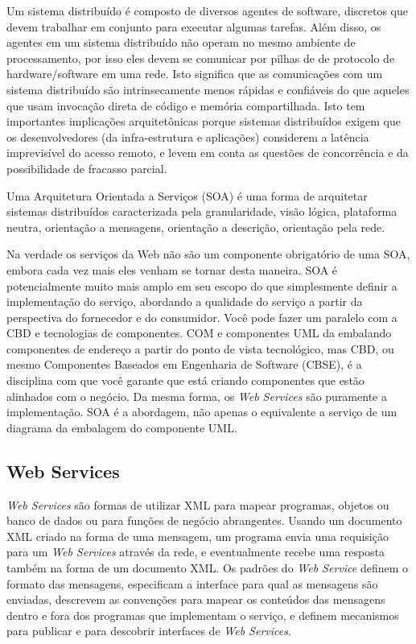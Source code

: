 \documentclass{acm_proc_article-sp}
\begin{document}
		\cite{SOA-Microsoft}
		
		Um sistema distribuído é composto de diversos agentes de software, discretos que devem trabalhar em conjunto para executar algumas tarefas. Além disso, os agentes em um sistema distribuído não operam no mesmo ambiente de processamento, por isso eles devem se comunicar por pilhas de de protocolo de hardware/software em uma rede. Isto significa que as comunicações com um sistema distribuído são intrinsecamente menos rápidas e confiáveis do que aqueles que usam invocação direta de código e memória compartilhada. Isto tem importantes implicações arquitetônicas porque sistemas distribuídos exigem que os desenvolvedores (da infra-estrutura e aplicações) considerem a latência imprevisível do acesso remoto, e levem em conta as questões de concorrência e da possibilidade de fracasso parcial.
		
		Uma Arquitetura Orientada a Serviços (SOA) é uma forma de arquitetar sistemas distribuídos caracterizada pela granularidade, visão lógica, plataforma neutra, orientação a mensagens, orientação a descrição, orientação pela rede.
		
		\cite{SOA-W3C}
		
		Na verdade os serviços da Web não são um componente obrigatório de uma SOA, embora cada vez mais eles venham se tornar desta maneira. SOA é potencialmente muito mais amplo em seu escopo do que simplesmente definir a implementação do serviço, abordando a qualidade do serviço a partir da perspectiva do fornecedor e do consumidor. Você pode fazer um paralelo com a CBD e tecnologias de componentes. COM e componentes UML da embalando componentes de endereço a partir do ponto de vista tecnológico, mas CBD, ou mesmo Componentes Baseados em Engenharia de Software (CBSE), é a disciplina com que você garante que está criando componentes que estão alinhados com o negócio. Da mesma forma, os \emph{Web Services} são puramente a implementação. SOA é a abordagem, não apenas o equivalente a serviço de um diagrama da embalagem do componente UML.
		
		\cite{SOA-Microsoft}
		
	\subsection{Web Services}
		
		\emph{Web Services} são formas de utilizar XML para mapear programas, objetos ou banco de dados ou para funções de negócio abrangentes. Usando um documento XML criado na forma de uma mensagem, um programa envia uma requisição para um \emph{Web Services} através da rede, e eventualmente recebe uma resposta também na forma de um documento XML. Os padrões do \emph{Web Service} definem o formato das mensagens, especificam a interface para qual as mensagens são enviadas, descrevem as convenções para mapear os conteúdos das mensagens dentro e fora dos programas que implementam o serviço, e definem mecanismos para publicar e para descobrir interfaces de \emph{Web Services}.
		
\end{document}
